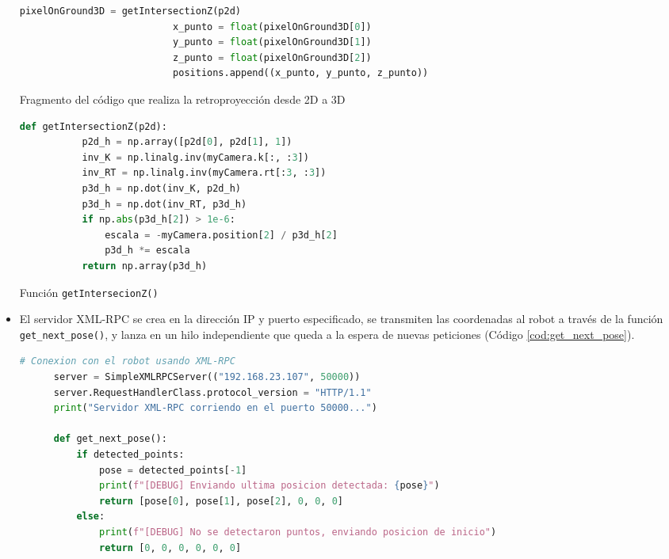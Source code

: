 \begin{itemize}
    \begin{code}[H]
      \begin{lstlisting}[language=Python] 
                           pixelOnGround3D = getIntersectionZ(p2d)
                           x_punto = float(pixelOnGround3D[0])
                           y_punto = float(pixelOnGround3D[1])
                           z_punto = float(pixelOnGround3D[2])
                           positions.append((x_punto, y_punto, z_punto)) 
      \end{lstlisting}
      \caption{Fragmento del código que realiza la retroproyección desde 2D a 3D}
      \label{cod:2D_a_3D}
    \end{code}                   
       
    \begin{code}[H]
      \begin{lstlisting}[language=Python]      
      def getIntersectionZ(p2d):
           p2d_h = np.array([p2d[0], p2d[1], 1])
           inv_K = np.linalg.inv(myCamera.k[:, :3])
           inv_RT = np.linalg.inv(myCamera.rt[:3, :3])
           p3d_h = np.dot(inv_K, p2d_h)
           p3d_h = np.dot(inv_RT, p3d_h)
           if np.abs(p3d_h[2]) > 1e-6:
               escala = -myCamera.position[2] / p3d_h[2]
               p3d_h *= escala
           return np.array(p3d_h)
      \end{lstlisting}
      \caption{Función \texttt{getIntersecionZ()}}
      \label{cod:getIntersectionZ}
    \end{code}                                    
                           
  \item El servidor XML-RPC se crea en la dirección IP y puerto especificado, se transmiten las coordenadas al robot a través de la función \texttt{get\_next\_pose()}, y lanza en un hilo independiente que queda a la espera de nuevas peticiones (Código \ref{cod:get_next_pose}).
  
    \begin{code}[H]
      \begin{lstlisting}[language=Python] 
      # Conexion con el robot usando XML-RPC
      server = SimpleXMLRPCServer(("192.168.23.107", 50000))
      server.RequestHandlerClass.protocol_version = "HTTP/1.1"
      print("Servidor XML-RPC corriendo en el puerto 50000...")
      
      def get_next_pose():
          if detected_points:
              pose = detected_points[-1]
              print(f"[DEBUG] Enviando ultima posicion detectada: {pose}")
              return [pose[0], pose[1], pose[2], 0, 0, 0]
          else:
              print(f"[DEBUG] No se detectaron puntos, enviando posicion de inicio")
              return [0, 0, 0, 0, 0, 0]


\end{lstlisting}
\end{code}
\end{itemize}
